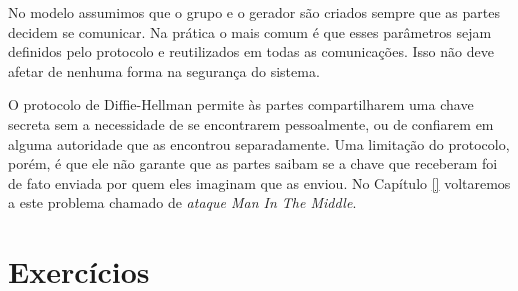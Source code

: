 No modelo assumimos que o grupo e o gerador são criados sempre que as partes decidem se comunicar.
Na prática o mais comum é que esses parâmetros sejam definidos pelo protocolo e reutilizados em todas as comunicações.
Isso não deve afetar de nenhuma forma na segurança do sistema.

O protocolo de Diffie-Hellman permite às partes compartilharem uma chave secreta sem a necessidade de se encontrarem pessoalmente, ou de confiarem em alguma autoridade que as encontrou separadamente.
Uma limitação do protocolo, porém, é que ele não garante que as partes saibam se a chave que receberam foi de fato enviada por quem eles imaginam que as enviou.
No Capítulo \ref{} voltaremos a este problema chamado de {\em ataque Man In The Middle}.


\section{Exercícios}
\label{sec:exercicios}



